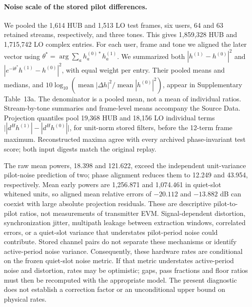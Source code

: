 \paragraph{Noise scale of the stored pilot differences.}
We pooled the 1,614 HUB and 1,513 LO test frames, six users, 64 and 63
retained streams, respectively, and three tones. This gives 1,859,328 HUB
and 1,715,742 LO complex entries. For each user, frame and tone we aligned
the later vector using
\(\theta^*=\arg\sum_a h^{(0)*}_a h^{(1)}_a\).
We summarized both \(|h^{(1)}-h^{(0)}|^2\) and
\(|e^{-\mathrm{i}\theta^*}h^{(1)}-h^{(0)}|^2\), with equal weight per entry.
Their pooled means and medians, and
\(10\log_{10}(\operatorname{mean}|\Delta h|^2/
\operatorname{mean}|h^{(0)}|^2)\), appear in Supplementary Table~13a.
The denominator is a pooled mean, not a mean of individual ratios.
Stream-by-tone summaries and frame-level means accompany the Source Data.
Projection quantiles pool 19,368 HUB and 18,156 LO individual terms
\(\big||d^Hh^{(1)}|-|d^Hh^{(0)}|\big|\), for unit-norm stored filters,
before the 12-term frame maximum. Reconstructed maxima agree with every
archived phase-invariant test score; both input digests match the original replay.

The raw mean powers, 18.398 and 121.622, exceed the independent unit-variance
pilot-noise prediction of two; phase alignment reduces them to 12.249 and
43.954, respectively. Mean early powers are 1,256.871 and 1,074.461 in
quiet-slot whitened units, so aligned mean relative errors of $-20.112$ and
$-13.882$ dB can coexist with large absolute projection residuals. These are
descriptive pilot-to-pilot ratios, not measurements of transmitter EVM.
Signal-dependent distortion, synchronization jitter, multipath leakage
between extraction windows, correlated errors, or a quiet-slot variance
that understates pilot-period noise could contribute. Stored channel pairs
do not separate these mechanisms or identify active-period noise variance.
Consequently, these hardware rates are conditional on the frozen quiet-slot
noise metric. If that metric understates active-period noise and distortion,
rates may be optimistic; gaps, pass fractions and floor ratios must then be
recomputed with the appropriate model. The present diagnostic does not
establish a correction factor or an unconditional upper bound on physical rates.
